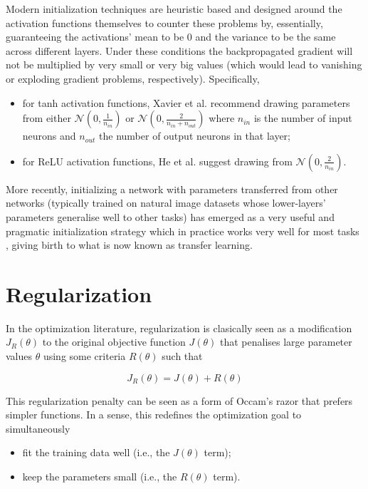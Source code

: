 Modern initialization techniques are heuristic based and designed around the activation functions themselves to counter these problems by, essentially, guaranteeing the activations' mean to be $0$ and the variance to be the same across different layers. Under these conditions the backpropagated gradient will not be multiplied by very small or very big values (which would lead to vanishing or exploding gradient problems, respectively). Specifically,

\begin{itemize}
    \item for tanh activation functions, Xavier et al. \cite{xavierinit} recommend drawing parameters from either $\mathcal{N}(0, \frac{1}{n_{in}})$ or $\mathcal{N}(0, \frac{2}{n_{in}+n_{out}})$ where $n_{in}$ is the number of input neurons and $n_{out}$ the number of output neurons in that layer;
    \item for ReLU activation functions, He et al. \cite{heinit} suggest drawing from $\mathcal{N}(0, \frac{2}{n_{in}})$.
\end{itemize}

More recently, initializing a network with parameters transferred from other networks (typically trained on natural image datasets whose lower-layers' parameters generalise well to other tasks) has emerged as a very useful and pragmatic initialization strategy which in practice works very well for most tasks \cite{howtransferable}, giving birth to what is now known as transfer learning.

\section{Regularization}

In the optimization literature, regularization is clasically seen as a modification $J_R(\theta)$ to the original objective function $J(\theta)$ that penalises large parameter values $\theta$ using some criteria $R(\theta)$ such that

$$
J_R(\theta) = J(\theta) + R(\theta)
$$

This regularization penalty can be seen as a form of Occam's razor that prefers simpler functions. In a sense, this redefines the optimization goal to simultaneously

\begin{itemize}
    \item fit the training data well (i.e., the $J(\theta)$ term);
    \item keep the parameters small (i.e., the $R(\theta)$ term).
\end{itemize}

